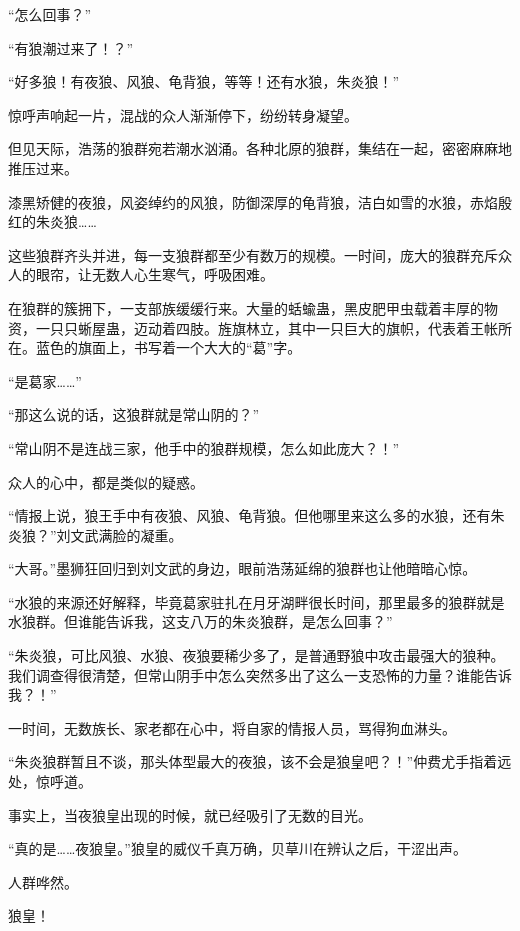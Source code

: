 
\begin{this_body}

“怎么回事？”

“有狼潮过来了！？”

“好多狼！有夜狼、风狼、龟背狼，等等！还有水狼，朱炎狼！”

惊呼声响起一片，混战的众人渐渐停下，纷纷转身凝望。

但见天际，浩荡的狼群宛若潮水汹涌。各种北原的狼群，集结在一起，密密麻麻地推压过来。

漆黑矫健的夜狼，风姿绰约的风狼，防御深厚的龟背狼，洁白如雪的水狼，赤焰殷红的朱炎狼……

这些狼群齐头并进，每一支狼群都至少有数万的规模。一时间，庞大的狼群充斥众人的眼帘，让无数人心生寒气，呼吸困难。

在狼群的簇拥下，一支部族缓缓行来。大量的蛞蝓蛊，黑皮肥甲虫载着丰厚的物资，一只只蜥屋蛊，迈动着四肢。旌旗林立，其中一只巨大的旗帜，代表着王帐所在。蓝色的旗面上，书写着一个大大的“葛”字。

“是葛家……”

“那这么说的话，这狼群就是常山阴的？”

“常山阴不是连战三家，他手中的狼群规模，怎么如此庞大？！”

众人的心中，都是类似的疑惑。

“情报上说，狼王手中有夜狼、风狼、龟背狼。但他哪里来这么多的水狼，还有朱炎狼？”刘文武满脸的凝重。

“大哥。”墨狮狂回归到刘文武的身边，眼前浩荡延绵的狼群也让他暗暗心惊。

“水狼的来源还好解释，毕竟葛家驻扎在月牙湖畔很长时间，那里最多的狼群就是水狼群。但谁能告诉我，这支八万的朱炎狼群，是怎么回事？”

“朱炎狼，可比风狼、水狼、夜狼要稀少多了，是普通野狼中攻击最强大的狼种。我们调查得很清楚，但常山阴手中怎么突然多出了这么一支恐怖的力量？谁能告诉我？！”

一时间，无数族长、家老都在心中，将自家的情报人员，骂得狗血淋头。

“朱炎狼群暂且不谈，那头体型最大的夜狼，该不会是狼皇吧？！”仲费尤手指着远处，惊呼道。

事实上，当夜狼皇出现的时候，就已经吸引了无数的目光。

“真的是……夜狼皇。”狼皇的威仪千真万确，贝草川在辨认之后，干涩出声。

人群哗然。

狼皇！


\end{this_body}
